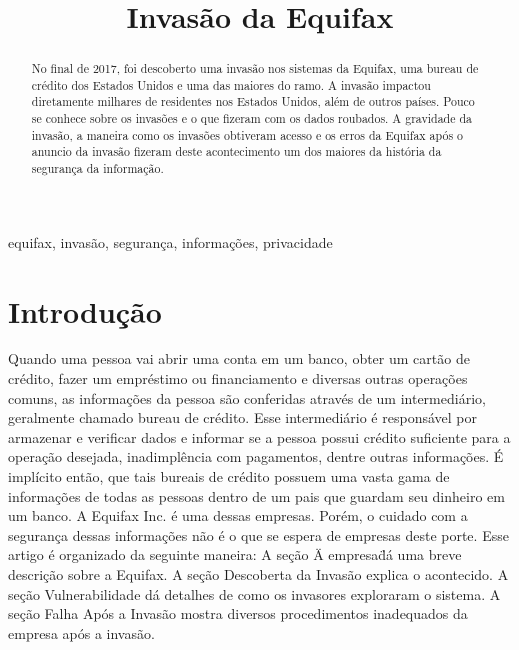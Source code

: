 \documentclass[conference]{IEEEtran}
\begin{document}
\title{Invasão da Equifax}

\author{
}

\maketitle

\begin{abstract}
No final de 2017, foi descoberto uma invasão nos sistemas da Equifax, uma bureau de crédito dos Estados Unidos e uma das maiores do ramo. A invasão impactou diretamente milhares de residentes nos
Estados Unidos, além de outros países. Pouco se conhece sobre os invasões e o que fizeram com os dados roubados. A gravidade da invasão, a maneira como os invasões obtiveram acesso e os erros da Equifax
após o anuncio da invasão fizeram deste acontecimento um dos maiores da história da segurança da informação.
\end{abstract}

\begin{IEEEkeywords}
equifax, invasão, segurança, informações, privacidade
\end{IEEEkeywords}

\section{Introdução}
Quando uma pessoa vai abrir uma conta em um banco, obter um cartão de crédito, fazer um empréstimo ou financiamento e diversas outras operações comuns, as informações da pessoa são conferidas através de um
intermediário, geralmente chamado bureau de crédito. Esse intermediário é responsável por armazenar e verificar dados e informar se a pessoa possui crédito suficiente para a operação desejada, inadimplência com pagamentos, dentre outras informações.
É implícito então, que tais bureais de crédito possuem uma vasta gama de informações de todas as pessoas dentro de um pais que guardam seu dinheiro em um banco.
A Equifax Inc. é uma dessas empresas. Porém, o cuidado com a segurança dessas informações não é o que se espera de empresas deste porte.
Esse artigo é organizado da seguinte maneira: A seção \"A empresa\" dá uma breve descrição sobre a Equifax. A seção Descoberta da Invasão explica o acontecido. 
A seção Vulnerabilidade dá detalhes de como os invasores exploraram o sistema. A seção Falha Após a Invasão mostra diversos procedimentos inadequados da empresa após a invasão.
\end{document}
